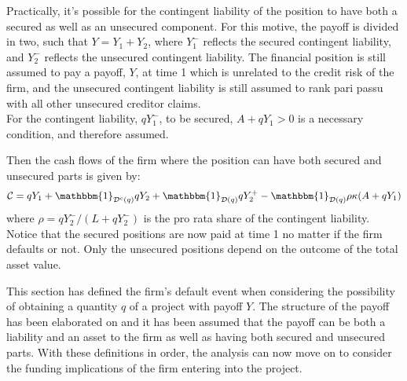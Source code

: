 \documentclass[main.tex]{subfiles}
\begin{document}
        Practically, it's possible for the contingent liability of the position
        to have both a secured as well as an unsecured component.
        For this motive, the payoff is divided in two, such that $Y=Y_1 + Y_2$, where $Y_1^{-}$ reflects the secured contingent liability, and $Y_2^{-}$ reflects the unsecured contingent liability.
        The financial position is still assumed to pay a payoff, $Y$, at time 1 which is unrelated to the credit risk of the firm, and the unsecured contingent liability is still assumed to rank pari passu with all other unsecured creditor claims.\\
        For the contingent liability, $qY_1^{-}$, to be secured, $A+qY_1 > 0$ is a necessary condition, and therefore assumed.

        Then the cash flows of the firm where the position 
        can have both secured and unsecured parts is given by:
        \begin{equation}
            \mathcal{C} =
                q Y_{1}
                + \mathbbm{1}_{\mathcal{D}^{c}(q)} qY_{2}
                + \mathbbm{1}_{\mathcal{D}(q)} qY_{2}^{+}
                - \mathbbm{1}_{\mathcal{D}(q)} \rho\kappa (A + qY_{1})
        \end{equation}
        where $\rho = qY_{2}^{-}/(L + qY_{2}^{-})$ is the pro rata share of the contingent liability. 
        Notice that the secured positions are now paid at time 1 no matter if the firm defaults or not. 
        Only the unsecured positions depend on the outcome of the total asset value.

        This section has defined the firm's default event when considering the possibility
        of obtaining a quantity $q$ of a project with payoff $Y$.
        The structure of the payoff has been elaborated on
        and it has been assumed that the payoff can be both a liability and an asset to the firm
        as well as having both secured and unsecured parts.
        With these definitions in order, the analysis can now move on to consider the
        funding implications of the firm entering into the project.
        
\end{document}
